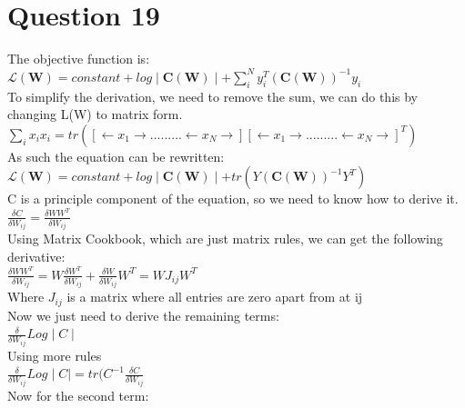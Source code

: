 \documentclass[a4paper, 9pt]{article}
\begin{document}
\section*{Question 19}
The objective function is: \\
\( \mathcal{L} (\mathbf{W}) = constant + log\mid \mathbf{C}(\mathbf{W})\mid + \sum\limits_{i}^N y_{i}^{T}(\mathbf{C}(\mathbf{W}))^{-1} y_{i} \) \\
\newline
To simplify the derivation, we need to remove the sum, we can do this by changing L(W) to matrix form. \\

\( \sum\limits_i x_{i}x_{i} = tr([\leftarrow x_{1} \rightarrow.........\leftarrow x_{N} \rightarrow][\leftarrow x_{1} \rightarrow.........\leftarrow x_{N} \rightarrow]^{T}) \) \\
\newline
As such the equation can be rewritten: \\ 

\( \mathcal{L}(\mathbf{W}) = constant + log\mid \mathbf{C}(\mathbf{W})\mid + tr(Y(\mathbf{C}(\mathbf{W}))^{-1}Y^T) \) \\
\newline
C is a principle component of the equation, so we need to know how to derive it.\\

\( \frac{\delta C}{\delta W_{ij}} = \frac{\delta WW^T}{\delta W_{ij}} \) \\
\newline
Using Matrix Cookbook, which are just matrix rules, we can get the following derivative: \\ 

\( \frac{\delta WW^T}{\delta W_{ij}} = W\frac{\delta W^T}{\delta W_{ij}} + \frac{\delta W}{\delta W_{ij}} W^T = WJ_{ij}W^T \) \\

Where \( J_{ij} \) is a matrix where all entries are zero apart from at ij \\
\newline
Now we just need to derive the remaining terms: \\

\( \frac{\delta}{\delta W_{ij}} Log \mid C \mid \) \\
\newline
Using more rules \\

\( \frac{\delta}{\delta W_{ij}} Log \mid C \mid = tr(C^{-1} \frac{\delta C}{\delta W_{ij}} \) \\
\newline
Now for the second term: \\
\end{document}
